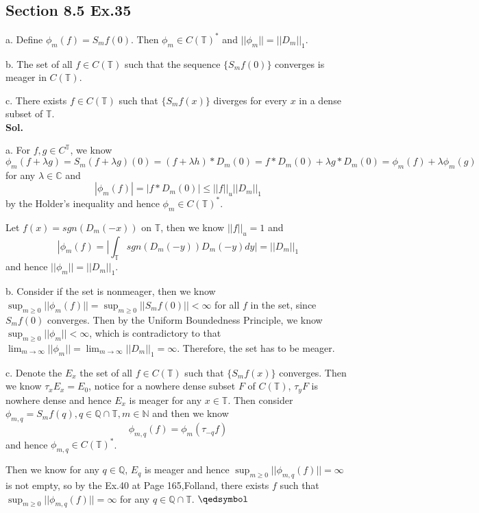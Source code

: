 \documentclass[lang=en,11pt,a4paper,citestyle =authoryear]{elegantpaper}
\newcommand{\prvd}{$\hfill \qedsymbol$}
\newcommand{\N}{\mathbb{N}}
\newcommand{\C}{\mathbb{C}}
\newcommand{\Q}{\mathbb{Q}}
\begin{document}
\subsection*{Section 8.5 Ex.35} 
a. Define $\phi_m(f) = S_mf(0)$. Then $\phi_m\in C(\mathbb{T})^*$ and $||\phi_m|| = ||D_m||_1$.\par
b. The set of all $f\in C(\mathbb{T})$ such that the sequence $\{S_mf(0)\}$ converges is meager in $C(\mathbb{T})$.\par
c. There exists $f\in C(\mathbb{T})$ such that $\{S_mf(x)\}$ diverges for every $x$ in a dense subset of $\mathbb{T}$.
\vspace{0.5em}\\
\textbf{Sol.} \par
a. For $f,g\in C^{\mathbb{T}}$, we know
\[
\phi_m(f+\lambda g) = S_m(f+\lambda g)(0) = (f+\lambda h)*D_m(0) = f*D_m(0) + \lambda g*D_m(0) = \phi_m(f)+\lambda \phi_m(g)
\]
for any $\lambda \in \C$ and
\[
|\phi_m(f)| = |f*D_m(0)| \leq ||f||_u||D_m||_1
\]
by the Holder's inequality and hence $\phi_m \in C(\mathbb{T})^*$.\par
Let $f(x) = sgn(D_m(-x))$ on $\mathbb{T}$, then we know $||f||_u = 1$ and
\[
|\phi_m(f) = |\int_{\mathbb{T}} sgn(D_m(-y))D_m(-y) dy| = ||D_m||_1
\]
and hence $||\phi_m|| = ||D_m||_1$.\par
b. Consider if the set is nonmeager, then we know $\sup_{m\geq 0}||\phi_m(f)|| = \sup_{m\geq 0}||S_mf(0)|| < \infty$ for all $f$ in the set, since $S_mf(0)$ converges. Then by the Uniform Boundedness Principle, we know $\sup_{m\geq 0}||\phi_m|| < \infty$, which is contradictory to that $\lim_{m\to\infty} ||\phi_m|| = \lim_{m\to\infty} ||D_m||_1 = \infty$. Therefore, the set has to be meager.\par
c. Denote the $E_x$ the set of all $f\in C(\mathbb{T})$ such that $\{S_mf(x)\}$ converges. Then we know $\tau_xE_x = E_0$, notice for a nowhere dense subset $F$ of $C(\mathbb{T})$, $\tau_yF$ is nowhere dense and hence $E_x$ is meager for any $x\in \mathbb{T}$. Then consider $\phi_{m,q} = S_mf(q), q\in\Q\cap\mathbb{T}, m\in \N$ and then we know
\[
\phi_{m,q}(f) = \phi_m(\tau_{-q}f)
\]
and hence $\phi_{m,q} \in C(\mathbb{T})^*$.\par
Then we know for any $q\in\Q$, $E_q$ is meager and hence $\sup_{m\geq 0}||\phi_{m,q}(f)|| =\infty$ is not empty, so by the Ex.40 at Page 165,Folland, there exists $f$ such that $\sup_{m\geq 0}||\phi_{m,q}(f)|| =\infty$ for any $q\in\Q\cap\mathbb{T}$.
\prvd
\end{document}
